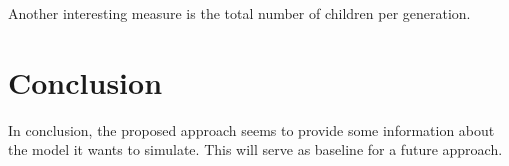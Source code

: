 \documentclass[conference]{IEEEtran}
\begin{document}
        Another interesting measure is the total number of children per generation.


    
\section{Conclusion}

In conclusion, the proposed approach seems to provide some information about the model it wants to simulate. This will serve as baseline for a future approach.

%
%
\end{document}

